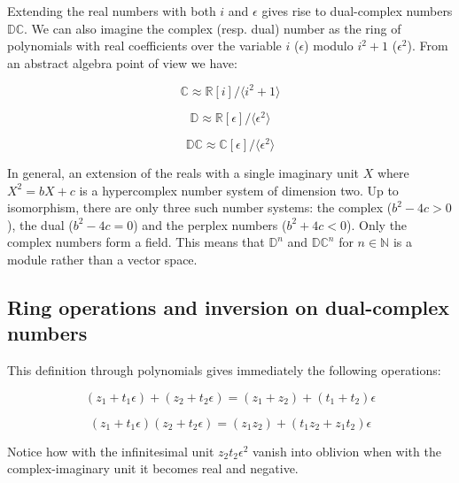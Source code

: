 \documentclass{article}
\newcommand{\N}{\mathbb{N}}
\newcommand{\R}{\mathbb{R}}
\newcommand{\C}{\mathbb{C}}
\newcommand{\D}{\mathbb{D}}
\newcommand{\DC}{\mathbb{DC}}
\newcommand{\e}{\epsilon}
\begin{document}
Extending the real numbers with both $i$ and $\e$ gives rise to dual-complex numbers $\DC$. We can also imagine the complex (resp. dual) number as the ring of polynomials with real coefficients over the variable $i$ ($\e$) modulo $i^2 + 1$ ($\e^2$). From an abstract algebra point of view we have:

\begin{multicols}{3}

\noindent
\begin{equation}
\C \approx \R [i]/\langle i^2+1 \rangle
\end{equation}

\columnbreak

\noindent
\begin{equation}
\D \approx \R [\e]/\langle \e^2 \rangle
\end{equation}

\columnbreak

\noindent
\begin{equation}
\DC \approx \C [\e]/\langle \e^2 \rangle
\end{equation}
\end{multicols}

In general, an extension of the reals with a single imaginary unit $X$ where $X^2 = bX + c$ is a hypercomplex number system of dimension two. Up to isomorphism, there are only three such number systems: the complex ($b^2 - 4c > 0$), the dual ($b^2 - 4c = 0$) and the perplex numbers ($b^2 + 4c < 0$). Only the complex numbers form a field. This means that $\D^n$ and $\DC^n$ for $n \in \N$ is a module rather than a vector space.

\subsection{Ring operations and inversion on dual-complex numbers}

This definition through polynomials gives immediately the following operations:

\begin{equation}
(z_1 + t_1 \e) + (z_2 + t_2 \e) = (z_1 + z_2) + (t_1 + t_2) \e
\end{equation}

\noindent \begin{equation}
(z_1 + t_1 \e) (z_2 + t_2 \e) = (z_1 z_2) + (t_1 z_2 + z_1 t_2) \e
\end{equation}

Notice how with the infinitesimal unit $z_2 t_2 \e^2$ vanish into oblivion when with the complex-imaginary unit it becomes real and negative.
\end{document}
